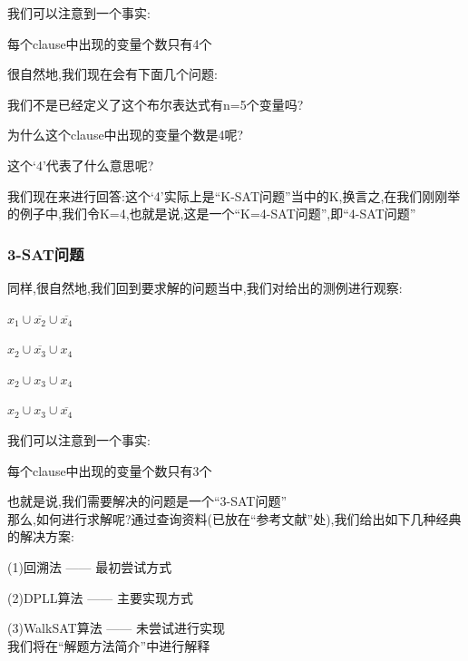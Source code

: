         我们可以注意到一个事实:\\
        \begin{center}
            每个clause中出现的变量个数只有4个
        \end{center}
        \par
        很自然地,我们现在会有下面几个问题:\\
        \begin{center}
            我们不是已经定义了这个布尔表达式有n=5个变量吗?
        \end{center}
        \begin{center}
            为什么这个clause中出现的变量个数是4呢?
        \end{center}
        \begin{center}
            这个`4'代表了什么意思呢?
        \end{center}
            \par
        我们现在来进行回答:这个`4'实际上是``K-SAT问题''当中的K,换言之,在我们刚刚举的例子中,我们令K=4,也就是说,这是一个``K=4-SAT问题'',即``4-SAT问题''
        \subsubsection{3-SAT问题}
        同样,很自然地,我们回到要求解的问题当中,我们对给出的测例进行观察:

        \begin{center}
            $x_{1} \cup \overline{x_{2}} \cup \overline{x_{4}}$
        \end{center}

        \begin{center}
            $x_{2} \cup \overline{x_{3}} \cup x_{4}$
        \end{center}
        \begin{center}
            $x_{2} \cup x_{3} \cup x_{4}$
        \end{center}
        \begin{center}
            $x_{2} \cup x_{3} \cup \overline{x_{4}}$
        \end{center}
        \par
        我们可以注意到一个事实:\\
        \begin{center}
            每个clause中出现的变量个数只有3个
        \end{center}
        \par
        也就是说,我们需要解决的问题是一个``3-SAT问题''\\
        那么,如何进行求解呢?通过查询资料(已放在``参考文献''处),我们给出如下几种经典的解决方案:\par
            (1)回溯法 —— 最初尝试方式\par
            (2)DPLL算法 —— 主要实现方式\par
            (3)WalkSAT算法 —— 未尝试进行实现\\
        我们将在``解题方法简介''中进行解释
